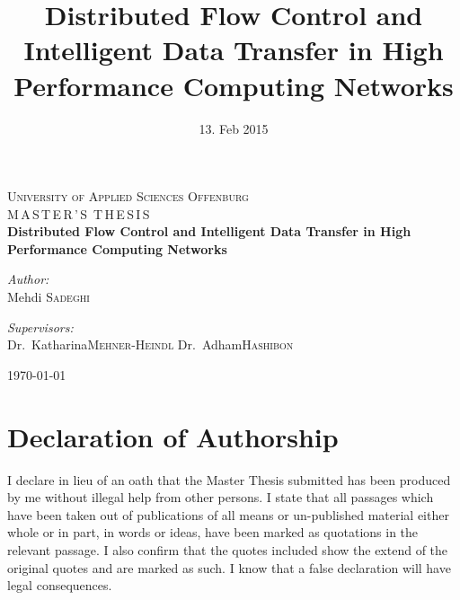 \documentclass[12pt, a4paper, oneside]{report}
\title{
      \textbf{Distributed Flow Control and Intelligent Data Transfer in High Performance Computing Networks}
      \vfill
}
\author{\large\sc{Mehdi Sadeghi}}
\date{13. Feb 2015}
\begin{document}
\nocite{*} %

\setlength{\unitlength}{1cm}


\begin{titlepage}
\begin{center}


\textsc{\LARGE University of Applied Sciences Offenburg}\\[1.5cm]

\textsc{\Large M\,A\,S\,T\,E\,R\,'\,S\, T\,H\,E\,S\,I\,S}\\[0.5cm]

{ \huge \bfseries Distributed Flow Control and Intelligent Data Transfer in High Performance Computing Networks \\[0.4cm] }


\noindent
\begin{minipage}{0.4\textwidth}
\begin{flushleft} \large
\emph{Author:}\\
Mehdi \textsc{Sadeghi}
\end{flushleft}
\end{minipage}%
\begin{minipage}{0.4\textwidth}
\begin{flushright} \large
\emph{Supervisors:} \\
Dr.~Katharina\textsc{Mehner-Heindl}
Dr.~Adham\textsc{Hashibon}
\end{flushright}
\end{minipage}

\vfill

{\large \today}

\end{center}
\end{titlepage}


\chapter*{Declaration of Authorship}
\noindent
I declare in lieu of an oath that the Master Thesis submitted has been produced by me without illegal help
from other persons. I state that all passages which have been taken out of publications of all means or un-published
material either whole or in part, in words or ideas, have been marked as quotations in the relevant passage. 
I also confirm that the quotes included show the extend of the original quotes and are marked
as such. I know that a false declaration will have legal consequences. \\
\end{document}
